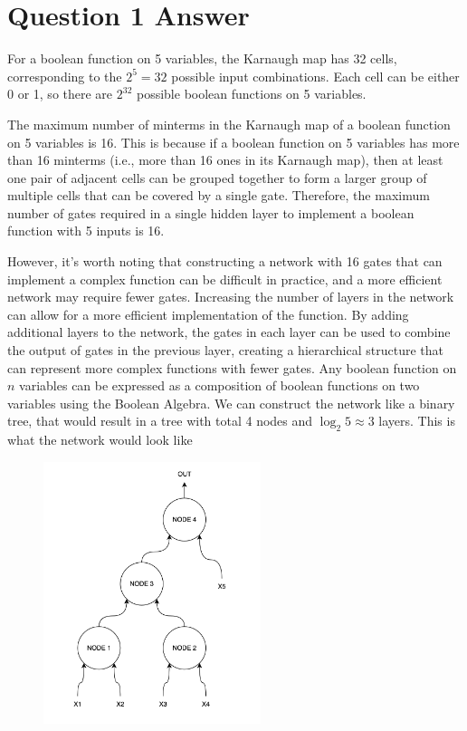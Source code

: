\documentclass{article}
\begin{document}
\thispagestyle{firstpage}

\section*{Question 1 Answer}

For a boolean function on 5 variables, the Karnaugh map has 32 cells, corresponding to the $2^{5} = 32$ possible input combinations. Each cell can be either 0 or 1, so there are $2^{32}$ possible boolean functions on 5 variables.

The maximum number of minterms in the Karnaugh map of a boolean function on 5 variables is 16. This is because if a boolean function on 5 variables has more than 16 minterms (i.e., more than 16 ones in its Karnaugh map), then at least one pair of adjacent cells can be grouped together to form a larger group of multiple cells that can be covered by a single gate. Therefore, the maximum number of gates required in a single hidden layer to implement a boolean function with 5 inputs is 16.

However, it's worth noting that constructing a network with 16 gates that can implement a complex function can be difficult in practice, and a more efficient network may require fewer gates. Increasing the number of layers in the network can allow for a more efficient implementation of the function. By adding additional layers to the network, the gates in each layer can be used to combine the output of gates in the previous layer, creating a hierarchical structure that can represent more complex functions with fewer gates. Any boolean function on $n$ variables can be expressed as a composition of boolean functions on two variables using the Boolean Algebra. We can construct the network like a binary tree, that would result in a tree with total 4 nodes and $\log_{2} 5 \approx 3$ layers. This is what the network would look like 

\begin{figure}[H]
  \centering
  \includegraphics[width=2.5in]{images/network.png}
\end{figure}
\end{document}
